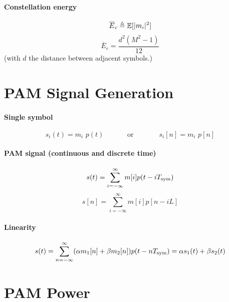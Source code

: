 \paragraph{Constellation energy}
\begin{equation}
\overline E_c \triangleq \mathbb{E} [ |m_i|^2 ]
\label{eq:pam_energy_contellation}
\end{equation}
\begin{equation}
\overline E_c = \frac{d^2 (M^2 - 1)}{12}
\label{eq:pamConstellationEnergy}
\end{equation}
(with $d$ the distance between adjacent symbols.)

\section*{PAM Signal Generation}

\paragraph{Single symbol}
\begin{equation}
s_i(t) = m_i \textrm{~} p(t)
\textrm{~~~~~~~~~~or~~~~~~~~~~~}
s_i[n] = m_i \textrm{~} p[n]
\label{eq:onepamsymbol}
\end{equation}

\paragraph{PAM signal (continuous and discrete time)}
\begin{equation}
s(t) = \sum_{i=-\infty}^{\infty} m[i] p(t-i {T_{\textrm{sym}}})
\label{eq:pam}
\end{equation}
\begin{equation}
s[n] = \sum_{i=-\infty}^{\infty} m[i] p[n- i L]
\label{eq:pam_discrete_time}
\end{equation}

\paragraph{Linearity}
\begin{equation}
s(t) = \sum_{n=-\infty}^{\infty} (\alpha m_1[n] + \beta m_2[n]) p(t-n {T_{\textrm{sym}}}) = \alpha s_1(t) + \beta s_2(t)
\label{eq:pam_linearity}
\end{equation}

\section*{PAM Power}

